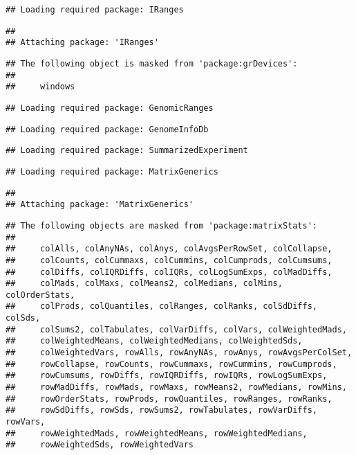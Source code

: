 \documentclass[
]{article}
\begin{document}
\begin{verbatim}
## Loading required package: IRanges
\end{verbatim}

\begin{verbatim}
## 
## Attaching package: 'IRanges'
\end{verbatim}

\begin{verbatim}
## The following object is masked from 'package:grDevices':
## 
##     windows
\end{verbatim}

\begin{verbatim}
## Loading required package: GenomicRanges
\end{verbatim}

\begin{verbatim}
## Loading required package: GenomeInfoDb
\end{verbatim}

\begin{verbatim}
## Loading required package: SummarizedExperiment
\end{verbatim}

\begin{verbatim}
## Loading required package: MatrixGenerics
\end{verbatim}

\begin{verbatim}
## 
## Attaching package: 'MatrixGenerics'
\end{verbatim}

\begin{verbatim}
## The following objects are masked from 'package:matrixStats':
## 
##     colAlls, colAnyNAs, colAnys, colAvgsPerRowSet, colCollapse,
##     colCounts, colCummaxs, colCummins, colCumprods, colCumsums,
##     colDiffs, colIQRDiffs, colIQRs, colLogSumExps, colMadDiffs,
##     colMads, colMaxs, colMeans2, colMedians, colMins, colOrderStats,
##     colProds, colQuantiles, colRanges, colRanks, colSdDiffs, colSds,
##     colSums2, colTabulates, colVarDiffs, colVars, colWeightedMads,
##     colWeightedMeans, colWeightedMedians, colWeightedSds,
##     colWeightedVars, rowAlls, rowAnyNAs, rowAnys, rowAvgsPerColSet,
##     rowCollapse, rowCounts, rowCummaxs, rowCummins, rowCumprods,
##     rowCumsums, rowDiffs, rowIQRDiffs, rowIQRs, rowLogSumExps,
##     rowMadDiffs, rowMads, rowMaxs, rowMeans2, rowMedians, rowMins,
##     rowOrderStats, rowProds, rowQuantiles, rowRanges, rowRanks,
##     rowSdDiffs, rowSds, rowSums2, rowTabulates, rowVarDiffs, rowVars,
##     rowWeightedMads, rowWeightedMeans, rowWeightedMedians,
##     rowWeightedSds, rowWeightedVars
\end{verbatim}
\end{document}
